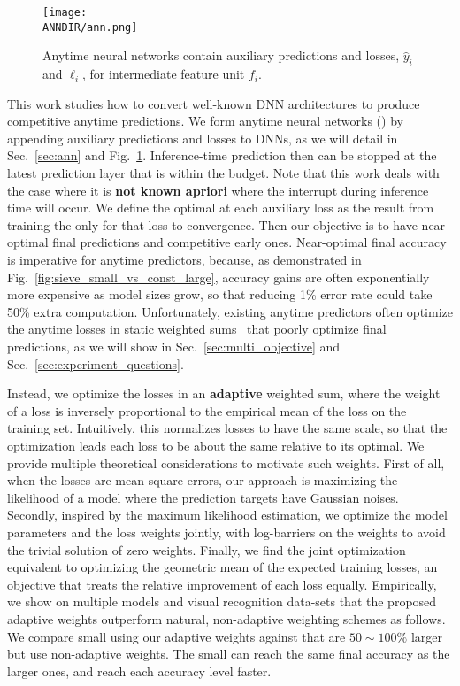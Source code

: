 \begin{figure}
    \centering
    \texttt{[image: \\ANNDIR/ann.png]}
    \caption{Anytime neural networks contain auxiliary predictions and losses, $\hat{y}_i$ and $\ell_i$, for intermediate feature unit $f_i$.  }
    \label{fig:ann}
\end{figure}

This work studies how to convert well-known DNN architectures to produce competitive anytime predictions.  
We form anytime neural networks (\anns) by appending auxiliary predictions and losses to DNNs, as we will detail in Sec.~\ref{sec:ann} and Fig.~\ref{fig:ann}. Inference-time prediction then can be stopped at the latest prediction layer that is within the budget. Note that this work deals with the case where it is \textbf{not known apriori} where the interrupt during inference time will occur. 
We define the optimal at each auxiliary loss as the result from training the \ann only for that loss to convergence. Then our objective is to have near-optimal final predictions and competitive early ones.  Near-optimal final accuracy is imperative for anytime predictors, because, as demonstrated in Fig.~\ref{fig:sieve_small_vs_const_large}, accuracy gains are often exponentially more expensive as model sizes grow, so that reducing 1\% error rate could take 50\% extra computation. Unfortunately, existing anytime predictors often optimize the anytime losses in static weighted sums~\cite{supervisednet,feedbacknet,msdense} that poorly optimize final predictions, as we will show in Sec.~\ref{sec:multi_objective} and Sec.~\ref{sec:experiment_questions}.

Instead, we optimize the losses in an \textbf{adaptive} weighted sum, where the weight of a loss is inversely proportional to the empirical mean of the loss on the training set. Intuitively, this normalizes losses to have the same scale, so that the optimization leads each loss to be about the same relative to its optimal. We provide multiple theoretical considerations to motivate such weights.
First of all, when the losses are mean square errors, our approach is maximizing the likelihood of a model where the prediction targets have Gaussian noises. Secondly, inspired by the maximum likelihood estimation, we optimize the model parameters and the loss weights jointly, with log-barriers on the weights to avoid the trivial solution of zero weights. Finally, we find the joint optimization equivalent to optimizing the geometric mean of the expected training losses, an objective that treats the relative improvement of each loss equally. Empirically, we show on multiple models and visual recognition data-sets that the proposed adaptive weights outperform natural, non-adaptive weighting schemes as follows.
We compare small \anns using our adaptive weights against \anns that are $50\sim 100\%$ larger but use non-adaptive weights. The small \anns can reach the same final accuracy as the larger ones, and reach each accuracy level faster.

